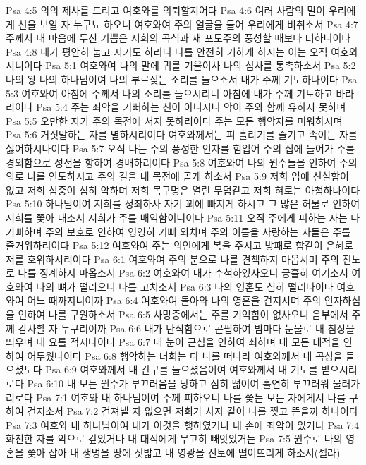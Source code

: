 Psa 4:5  의의 제사를 드리고 여호와를 의뢰할지어다
Psa 4:6  여러 사람의 말이 우리에게 선을 보일 자 누구뇨 하오니 여호와여 주의 얼굴을 들어 우리에게 비취소서
Psa 4:7  주께서 내 마음에 두신 기쁨은 저희의 곡식과 새 포도주의 풍성할 때보다 더하니이다
Psa 4:8  내가 평안히 눕고 자기도 하리니 나를 안전히 거하게 하시는 이는 오직 여호와시니이다
Psa 5:1  여호와여 나의 말에 귀를 기울이사 나의 심사를 통촉하소서
Psa 5:2  나의 왕 나의 하나님이여 나의 부르짖는 소리를 들으소서 내가 주께 기도하나이다
Psa 5:3  여호와여 아침에 주께서 나의 소리를 들으시리니 아침에 내가 주께 기도하고 바라리이다
Psa 5:4  주는 죄악을 기뻐하는 신이 아니시니 악이 주와 함께 유하지 못하며
Psa 5:5  오만한 자가 주의 목전에 서지 못하리이다 주는 모든 행악자를 미워하시며
Psa 5:6  거짓말하는 자를 멸하시리이다 여호와께서는 피 흘리기를 즐기고 속이는 자를 싫어하시나이다
Psa 5:7  오직 나는 주의 풍성한 인자를 힘입어 주의 집에 들어가 주를 경외함으로 성전을 향하여 경배하리이다
Psa 5:8  여호와여 나의 원수들을 인하여 주의 의로 나를 인도하시고 주의 길을 내 목전에 곧게 하소서
Psa 5:9  저희 입에 신실함이 없고 저희 심중이 심히 악하며 저희 목구멍은 열린 무덤같고 저희 혀로는 아첨하나이다
Psa 5:10  하나님이여 저희를 정죄하사 자기 꾀에 빠지게 하시고 그 많은 허물로 인하여 저희를 쫓아 내소서 저희가 주를 배역함이니이다
Psa 5:11  오직 주에게 피하는 자는 다 기뻐하며 주의 보호로 인하여 영영히 기뻐 외치며 주의 이름을 사랑하는 자들은 주를 즐거워하리이다
Psa 5:12  여호와여 주는 의인에게 복을 주시고 방패로 함같이 은혜로 저를 호위하시리이다
Psa 6:1  여호와여 주의 분으로 나를 견책하지 마옵시며 주의 진노로 나를 징계하지 마옵소서
Psa 6:2  여호와여 내가 수척하였사오니 긍휼히 여기소서 여호와여 나의 뼈가 떨리오니 나를 고치소서
Psa 6:3  나의 영혼도 심히 떨리나이다 여호와여 어느 때까지니이까
Psa 6:4  여호와여 돌아와 나의 영혼을 건지시며 주의 인자하심을 인하여 나를 구원하소서
Psa 6:5  사망중에서는 주를 기억함이 없사오니 음부에서 주께 감사할 자 누구리이까
Psa 6:6  내가 탄식함으로 곤핍하여 밤마다 눈물로 내 침상을 띄우며 내 요를 적시나이다
Psa 6:7  내 눈이 근심을 인하여 쇠하며 내 모든 대적을 인하여 어두웠나이다
Psa 6:8  행악하는 너희는 다 나를 떠나라 여호와께서 내 곡성을 들으셨도다
Psa 6:9  여호와께서 내 간구를 들으셨음이여 여호와께서 내 기도를 받으시리로다
Psa 6:10  내 모든 원수가 부끄러움을 당하고 심히 떪이여 홀연히 부끄러워 물러가리로다
Psa 7:1  여호와 내 하나님이여 주께 피하오니 나를 쫓는 모든 자에게서 나를 구하여 건지소서
Psa 7:2  건져낼 자 없으면 저희가 사자 같이 나를 찢고 뜯을까 하나이다
Psa 7:3  여호와 내 하나님이여 내가 이것을 행하였거나 내 손에 죄악이 있거나
Psa 7:4  화친한 자를 악으로 갚았거나 내 대적에게 무고히 빼앗았거든
Psa 7:5  원수로 나의 영혼을 쫓아 잡아 내 생명을 땅에 짓밟고 내 영광을 진토에 떨어뜨리게 하소서(셀라)
